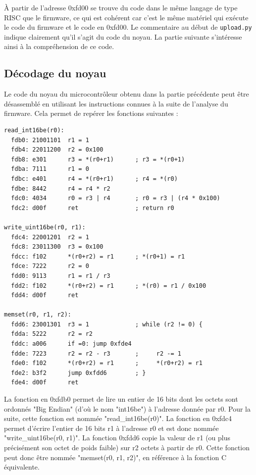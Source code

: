 \documentclass[a4paper,10pt]{article}
\begin{document}
À partir de l'adresse 0xfd00  se trouve du code dans le même langage de type RISC que le firmware, ce qui est cohérent car c'est le même matériel qui exécute le code du firmware et le code en 0xfd00. Le commentaire au début de \texttt{upload.py} indique clairement qu'il s'agit du code du noyau. La partie suivante s'intéresse ainsi à la compréhension de ce code.

\subsection{Décodage du noyau}

Le code du noyau du microcontrôleur obtenu dans la partie précédente peut être désassemblé en utilisant les instructions connues à la suite de l'analyse du firmware. Cela permet de repérer les fonctions suivantes :

\begin{verbatim}
read_int16be(r0):
  fdb0: 21001101  r1 = 1
  fdb4: 22011200  r2 = 0x100
  fdb8: e301      r3 = *(r0+r1)      ; r3 = *(r0+1)
  fdba: 7111      r1 = 0
  fdbc: e401      r4 = *(r0+r1)      ; r4 = *(r0)
  fdbe: 8442      r4 = r4 * r2
  fdc0: 4034      r0 = r3 | r4       ; r0 = r3 | (r4 * 0x100)
  fdc2: d00f      ret                ; return r0

write_uint16be(r0, r1):
  fdc4: 22001201  r2 = 1
  fdc8: 23011300  r3 = 0x100
  fdcc: f102      *(r0+r2) = r1      ; *(r0+1) = r1
  fdce: 7222      r2 = 0
  fdd0: 9113      r1 = r1 / r3
  fdd2: f102      *(r0+r2) = r1      ; *(r0) = r1 / 0x100
  fdd4: d00f      ret

memset(r0, r1, r2):
  fdd6: 23001301  r3 = 1             ; while (r2 != 0) {
  fdda: 5222      r2 = r2
  fddc: a006      if =0: jump 0xfde4
  fdde: 7223      r2 = r2 - r3       ;     r2 -= 1
  fde0: f102      *(r0+r2) = r1      ;     *(r0+r2) = r1
  fde2: b3f2      jump 0xfdd6        ; }
  fde4: d00f      ret
\end{verbatim}

La fonction en 0xfdb0 permet de lire un entier de 16 bits dont les octets sont ordonnés "Big Endian" (d'où le nom "int16be") à l'adresse donnée par r0. Pour la suite, cette fonction est nommée "read\_int16be(r0)". La fonction en 0xfdc4 permet d'écrire l'entier de 16 bits r1 à l'adresse r0 et est donc nommée "write\_uint16be(r0, r1)". La fonction 0xfdd6 copie la valeur de r1 (ou plus précisément son octet de poids faible) sur r2 octets à partir de r0. Cette fonction peut donc être nommée "memset(r0, r1, r2)", en référence à la fonction C équivalente.
\end{document}
